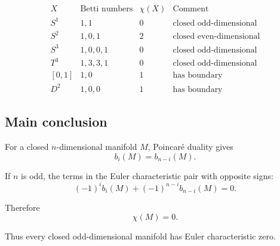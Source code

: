 \documentclass[12pt,a4paper]{article}
\theoremstyle{notespace}
\begin{document}
\[
\begin{array}{c|c|c|c}
	X & \text{Betti numbers} & \chi(X) & \text{Comment} \\
	\hline
	S^1 & 1,1 & 0 & \text{closed odd-dimensional} \\
	S^2 & 1,0,1 & 2 & \text{closed even-dimensional} \\
	S^3 & 1,0,0,1 & 0 & \text{closed odd-dimensional} \\
	T^3 & 1,3,3,1 & 0 & \text{closed odd-dimensional} \\
\left[0,1\right] & 1,0 & 1 & \text{has boundary}\\
	D^2 & 1,0,0 & 1 & \text{has boundary}
\end{array}
\]

\subsection{Main conclusion}

For a closed $n$-dimensional manifold $M$, Poincaré duality gives
\[
b_i(M)=b_{n-i}(M).
\]

If $n$ is odd, the terms in the Euler characteristic pair with opposite signs:
\[
(-1)^i b_i(M)
+
(-1)^{n-i}b_{n-i}(M)
=
0.
\]

Therefore
\[
\boxed{\chi(M)=0.}
\]

Thus every closed odd-dimensional manifold has Euler characteristic zero.
\end{document}
